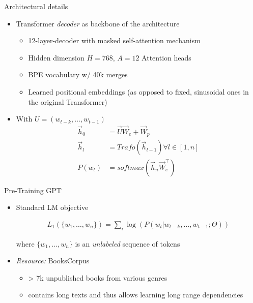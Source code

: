 \begin{vbframe}{Architectural details}

\vfill

	\begin{itemize}
		\item Transformer \textit{decoder} as backbone of the architecture
			\begin{itemize}
				\item 12-layer-decoder with masked self-attention mechanism
				\item Hidden dimension $H = 768$, $A = 12$ Attention heads
				\item BPE vocabulary w/ 40k merges
				\item Learned positional embeddings (as opposed to fixed, sinusoidal ones in the original Transformer)
			\end{itemize}
		\item With $U = (w_{t-k}, \hdots, w_{t-1})$
\begin{align*}
	\vec h_0 &= \vec U \vec W_e + \vec W_p \\
	\vec h_l &= Trafo(\vec h_{l-1}) \forall l \in [1,n]\\
	P(w_t) &= softmax(\vec h_n \vec W_e^\top)
\end{align*}
	\end{itemize}

\vfill

\end{vbframe}


\begin{vbframe}{Pre-Training GPT}

\vfill

\begin{itemize}
		\item Standard LM objective

\begin{align*}
	L_1(\{w_1, \hdots, w_n\}) = \sum_i \log(P(w_t | w_{t-k}, \hdots, w_{t-1}; \Theta))
\end{align*}
					
					where $\{w_1, \hdots, w_n\}$ is an \textit{unlabeled} sequence of tokens

		\item \textit{Resource:} BooksCorpus 
			\begin{itemize}
				\item > 7k unpublished books from various genres
				\item contains long texts and thus allows learning long range dependencies
			\end{itemize}
\end{itemize}

\vfill

\end{vbframe}

